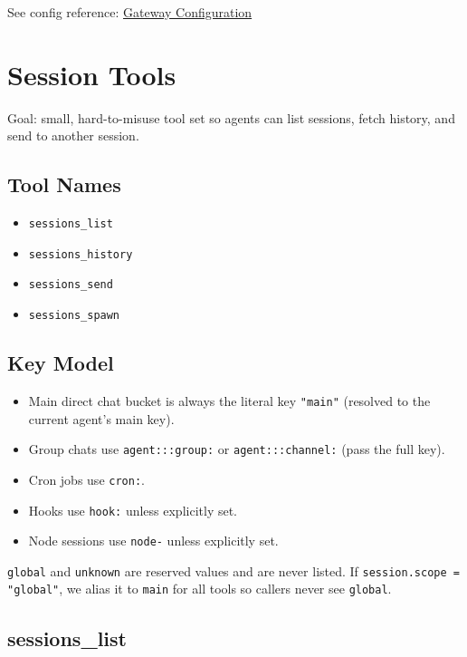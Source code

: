 See config reference: \href{/gateway/configuration}{Gateway Configuration}


\clearpage

\section{Session Tools}


Goal: small, hard-to-misuse tool set so agents can list sessions, fetch history, and send to another session.

\subsection{Tool Names}


\begin{itemize}
  \item \texttt{sessions\_list}
  \item \texttt{sessions\_history}
  \item \texttt{sessions\_send}
  \item \texttt{sessions\_spawn}
\end{itemize}


\subsection{Key Model}


\begin{itemize}
  \item Main direct chat bucket is always the literal key \texttt{"main"} (resolved to the current agent’s main key).
  \item Group chats use \texttt{agent:::group:} or \texttt{agent:::channel:} (pass the full key).
  \item Cron jobs use \texttt{cron:}.
  \item Hooks use \texttt{hook:} unless explicitly set.
  \item Node sessions use \texttt{node-} unless explicitly set.
\end{itemize}


\texttt{global} and \texttt{unknown} are reserved values and are never listed. If \texttt{session.scope = "global"}, we alias it to \texttt{main} for all tools so callers never see \texttt{global}.

\subsection{sessions\_list}


